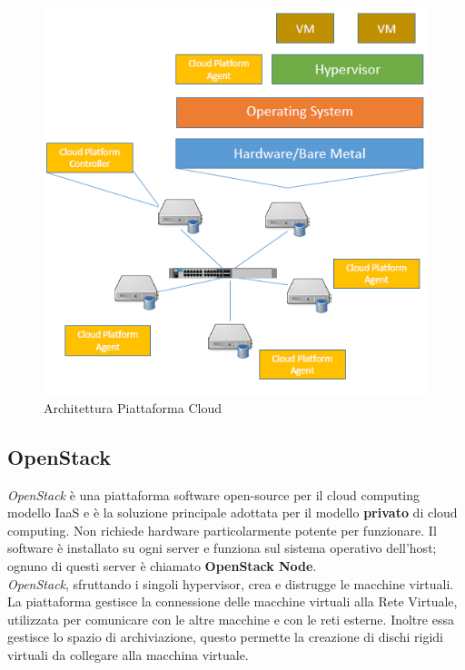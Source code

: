 \documentclass{article}
\begin{document}
\begin{figure}[H]
    \centering
    \includegraphics[scale=0.5]{img/cp_architecture.png}
    \caption{Architettura Piattaforma Cloud}
\end{figure}\noindent

\subsection{OpenStack}
\textit{OpenStack} è una piattaforma software open-source per il cloud computing modello IaaS e è la soluzione principale adottata per il modello \textbf{privato} di cloud computing. Non richiede hardware particolarmente potente per funzionare. Il software è installato su ogni server e funziona sul sistema operativo dell'host; ognuno di questi server è chiamato \textbf{OpenStack Node}.\\
\textit{OpenStack}, sfruttando i singoli hypervisor, crea e distrugge le macchine virtuali.
La piattaforma gestisce la connessione delle macchine virtuali alla Rete Virtuale, utilizzata per comunicare con le altre macchine e con le reti esterne.
Inoltre essa gestisce lo spazio di archiviazione, questo permette la creazione di dischi rigidi virtuali da collegare alla macchina virtuale.
\end{document}
